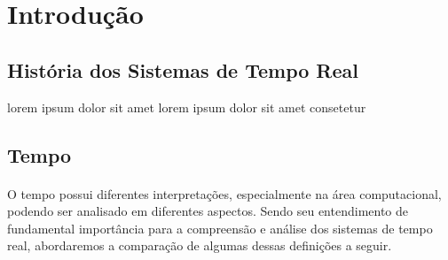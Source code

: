 \section{Introdução}
\subsection{História dos Sistemas de Tempo Real}
lorem ipsum dolor sit amet lorem ipsum dolor sit amet consetetur

\subsection{Tempo}
\paragraph{}
O tempo possui diferentes interpretações, especialmente na área computacional,
podendo ser analisado em diferentes aspectos. Sendo seu entendimento de
fundamental importância para a compreensão e análise dos sistemas de tempo
real, abordaremos a comparação de algumas dessas definições a seguir.~\cite{FARINESSIS00}

